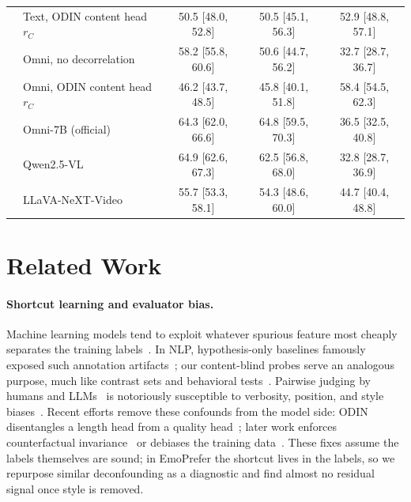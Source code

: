 \documentclass[sigconf,screen]{acmart}
\begin{document}
\begin{table}[t]
\begin{tabular}{llccc}
  & Text, ODIN content head $r_C$~\cite{chen2024odin} & 50.5 [48.0, 52.8] & 50.5 [45.1, 56.3] & 52.9 [48.8, 57.1] \\
  & Omni, no decorrelation & 58.2 [55.8, 60.6] & 50.6 [44.7, 56.2] & 32.7 [28.7, 36.7] \\
  & Omni, ODIN content head $r_C$ & 46.2 [43.7, 48.5] & 45.8 [40.1, 51.8] & 58.4 [54.5, 62.3] \\
  \midrule
  & Omni-7B (official) & 64.3 [62.0, 66.6] & 64.8 [59.5, 70.3] & 36.5 [32.5, 40.8] \\
  & Qwen2.5-VL & 64.9 [62.6, 67.3] & 62.5 [56.8, 68.0] & 32.8 [28.7, 36.9] \\
  & LLaVA-NeXT-Video & 55.7 [53.3, 58.1] & 54.3 [48.6, 60.0] & 44.7 [40.4, 48.8] \\
  \bottomrule
  \end{tabular}
\end{table}

\section{Related Work}
\paragraph{Shortcut learning and evaluator bias.}
Machine learning models tend to exploit whatever spurious feature most cheaply separates the training labels~\cite{geirhos2020shortcut,sagawadistributionally}. In NLP, hypothesis-only baselines famously exposed such annotation artifacts~\cite{gururangan2018annotation,poliak2018hypothesis,mccoy2019right}; our content-blind probes serve an analogous purpose, much like contrast sets and behavioral tests~\cite{gardner2020evaluating,ribeiro2020beyond}. Pairwise judging by humans and LLMs~\cite{zheng2023judging,liu2023g,kim2024prometheus} is notoriously susceptible to verbosity, position, and style biases~\cite{wang2024large,singhal2023long,liu2025rm,dubois2024length}. Recent efforts remove these confounds from the model side: ODIN disentangles a length head from a quality head~\cite{chen2024odin}; later work enforces counterfactual invariance~\cite{wang2025beyond,srivastavarobust} or debiases the training data~\cite{park2024offsetbias,liu2025rrm,ye2026rectifying}. These fixes assume the labels themselves are sound; in EmoPrefer the shortcut lives in the labels, so we repurpose similar deconfounding as a diagnostic and find almost no residual signal once style is removed.
\end{document}
